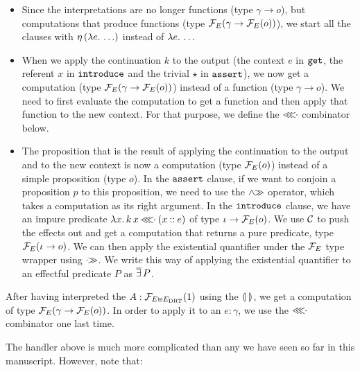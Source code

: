 \begin{itemize}
\item Since the interpretations are no longer functions (type
  $\gamma \to o$), but computations that produce functions (type
  $\mathcal{F}_E(\gamma \to \mathcal{F}_E(o))$), we start all the clauses with
  $\eta\,(\lambda e.\, \ldots)$ instead of $\lambda e.\, \ldots$
\item When we apply the continuation $k$ to the output (the context $e$ in
  $\mathtt{get}$, the referent $x$ in $\mathtt{introduce}$ and the trivial $\star$
  in $\mathtt{assert}$), we now get a computation (type
  $\mathcal{F}_E(\gamma \to \mathcal{F}_E(o))$) instead of a function (type
  $\gamma \to o$). We need to first evaluate the computation to get a
  function and then apply that function to the new context. For that
  purpose, we define the $\mathbin{\lll\!\!\cdot}$ combinator below.
\item The proposition that is the result of applying the continuation to
  the output and to the new context is now a computation (type $\mathcal{F}_E(o)$)
  instead of a simple proposition (type $o$). In the $\mathtt{assert}$ clause,
  if we want to conjoin a proposition $p$ to this proposition, we need to
  use the $\mathbin{\land\!\!\gg}$ operator, which takes a computation as its right
  argument. In the $\mathtt{introduce}$ clause, we have an impure predicate
  $\lambda x.\, k\,x \mathbin{\lll\!\!\cdot} (x \mathbin{::} e)$ of type $\iota \to \mathcal{F}_E(o)$. We
  use $\mathcal{C}$ to push the effects out and get a computation that returns a
  pure predicate, type $\mathcal{F}_E(\iota \to o)$. We can then apply the
  existential quantifier under the $\mathcal{F}_E$ type wrapper using $\mathbin{\cdot\!\!\gg}$. We
  write this way of applying the existential quantifier to an effectful
  predicate $P$ as $\mathop{\overline{\exists}} P$.
\end{itemize}

After having interpreted the $A : \mathcal{F}_{E \uplus E_{\mathrm{DRT}}}(1)$ using the
$\llparenthesis \,  \, \rrparenthesis$, we get a computation of type $\mathcal{F}_E(\gamma \to \mathcal{F}_E(o))$. In
order to apply it to an $e : \gamma$, we use the $\mathbin{\lll\!\!\cdot}$ combinator one
last time.

The handler above is much more complicated than any we have seen so far in
this manuscript. However, note that:

